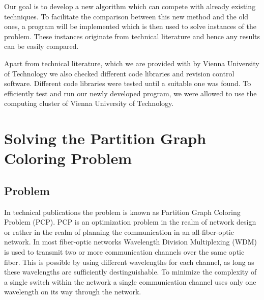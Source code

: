 \documentclass[paper=a4,fontsize=12pt]{scrartcl}
\begin{document}
Our goal is to develop a new algorithm which can compete with already existing techniques. To facilitate the comparison between this new method and the old ones, a program will be implemented which is then used to solve instances of the problem. These instances originate from technical literature and hence any results can be easily compared.


Apart from technical literature, which we are provided with by Vienna University of Technology we also checked different code libraries and revision control software. Different code libraries were tested until a suitable one was found. To efficiently test and run our newly developed program, we were allowed to use the computing cluster of Vienna University of Technology.


\section{Solving the Partition Graph Coloring Problem}

\subsection{Problem}
In technical publications the problem is known as Partition Graph Coloring Problem (PCP). PCP is an optimization problem in the realm of network design or rather in the realm of planning the communication in an all-fiber-optic network. In most fiber-optic networks Wavelength Division Multiplexing (WDM) is used to transmit two or more communication channels over the same optic fiber. This is possible by using different wavelengths for each channel, as long as these wavelengths are sufficiently destinguishable. To minimize the complexity of a single switch within the network a single communication channel uses only one wavelength on its way through the network.
\end{document}

